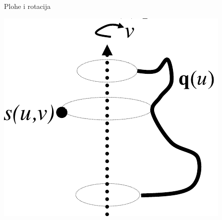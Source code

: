 \documentclass[9pt]{beamer}
\begin{document}
\begin{frame}{Plohe i rotacija}
	\begin{center}
		\includegraphics[height=4.cm]{./slike/surface_revolution_02.png}
	\end{center}
\end{frame}

\end{document}
